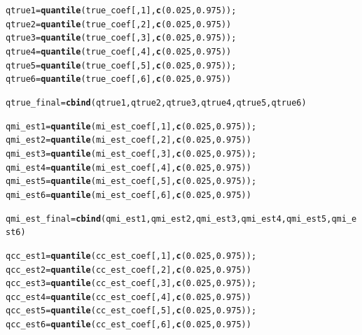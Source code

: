 \documentclass[fleqn,10pt]{wlscirep}\usepackage[]{graphicx}\usepackage[]{color}
\makeatletter
\newcommand{\hlnum}[1]{\textcolor[rgb]{0.686,0.059,0.569}{#1}}%
\newcommand{\hlstd}[1]{\textcolor[rgb]{0.345,0.345,0.345}{#1}}%
\newcommand{\hlkwb}[1]{\textcolor[rgb]{0.69,0.353,0.396}{#1}}%
\newcommand{\hlkwd}[1]{\textcolor[rgb]{0.737,0.353,0.396}{\textbf{#1}}}%
\newenvironment{kframe}{%
 \def\at@end@of@kframe{}%
 \ifinner\ifhmode%
  \def\at@end@of@kframe{\end{minipage}}%
  \begin{minipage}{\columnwidth}%
 \fi\fi%
 \def\FrameCommand##1{\hskip\@totalleftmargin \hskip-\fboxsep
 \colorbox{shadecolor}{##1}\hskip-\fboxsep
     \hskip-\linewidth \hskip-\@totalleftmargin \hskip\columnwidth}%
 \MakeFramed {\advance\hsize-\width
   \@totalleftmargin\z@ \linewidth\hsize
   \@setminipage}}%
 {\par\unskip\endMakeFramed%
 \at@end@of@kframe}
\newenvironment{knitrout}{}{} %
\makeatother
\begin{document}
\begin{knitrout}
\begin{kframe}
\begin{alltt}
  \hlstd{qtrue1} \hlkwb{=} \hlkwd{quantile}\hlstd{(true_coef[,}\hlnum{1}\hlstd{],} \hlkwd{c}\hlstd{(}\hlnum{0.025}\hlstd{,} \hlnum{0.975}\hlstd{));}
  \hlstd{qtrue2} \hlkwb{=} \hlkwd{quantile}\hlstd{(true_coef[,}\hlnum{2}\hlstd{],} \hlkwd{c}\hlstd{(}\hlnum{0.025}\hlstd{,} \hlnum{0.975}\hlstd{))}
  \hlstd{qtrue3} \hlkwb{=} \hlkwd{quantile}\hlstd{(true_coef[,}\hlnum{3}\hlstd{],} \hlkwd{c}\hlstd{(}\hlnum{0.025}\hlstd{,} \hlnum{0.975}\hlstd{));}
  \hlstd{qtrue4} \hlkwb{=} \hlkwd{quantile}\hlstd{(true_coef[,}\hlnum{4}\hlstd{],} \hlkwd{c}\hlstd{(}\hlnum{0.025}\hlstd{,} \hlnum{0.975}\hlstd{))}
  \hlstd{qtrue5} \hlkwb{=} \hlkwd{quantile}\hlstd{(true_coef[,}\hlnum{5}\hlstd{],} \hlkwd{c}\hlstd{(}\hlnum{0.025}\hlstd{,} \hlnum{0.975}\hlstd{));}
  \hlstd{qtrue6} \hlkwb{=} \hlkwd{quantile}\hlstd{(true_coef[,}\hlnum{6}\hlstd{],} \hlkwd{c}\hlstd{(}\hlnum{0.025}\hlstd{,} \hlnum{0.975}\hlstd{))}

  \hlstd{qtrue_final} \hlkwb{=} \hlkwd{cbind}\hlstd{(qtrue1, qtrue2, qtrue3, qtrue4, qtrue5, qtrue6)}

  \hlstd{qmi_est1} \hlkwb{=} \hlkwd{quantile}\hlstd{(mi_est_coef[,}\hlnum{1}\hlstd{],} \hlkwd{c}\hlstd{(}\hlnum{0.025}\hlstd{,} \hlnum{0.975}\hlstd{));}
  \hlstd{qmi_est2} \hlkwb{=} \hlkwd{quantile}\hlstd{(mi_est_coef[,}\hlnum{2}\hlstd{],} \hlkwd{c}\hlstd{(}\hlnum{0.025}\hlstd{,} \hlnum{0.975}\hlstd{))}
  \hlstd{qmi_est3} \hlkwb{=} \hlkwd{quantile}\hlstd{(mi_est_coef[,}\hlnum{3}\hlstd{],} \hlkwd{c}\hlstd{(}\hlnum{0.025}\hlstd{,} \hlnum{0.975}\hlstd{));}
  \hlstd{qmi_est4} \hlkwb{=} \hlkwd{quantile}\hlstd{(mi_est_coef[,}\hlnum{4}\hlstd{],} \hlkwd{c}\hlstd{(}\hlnum{0.025}\hlstd{,} \hlnum{0.975}\hlstd{))}
  \hlstd{qmi_est5} \hlkwb{=} \hlkwd{quantile}\hlstd{(mi_est_coef[,}\hlnum{5}\hlstd{],} \hlkwd{c}\hlstd{(}\hlnum{0.025}\hlstd{,} \hlnum{0.975}\hlstd{));}
  \hlstd{qmi_est6} \hlkwb{=} \hlkwd{quantile}\hlstd{(mi_est_coef[,}\hlnum{6}\hlstd{],} \hlkwd{c}\hlstd{(}\hlnum{0.025}\hlstd{,} \hlnum{0.975}\hlstd{))}

  \hlstd{qmi_est_final} \hlkwb{=} \hlkwd{cbind}\hlstd{(qmi_est1, qmi_est2, qmi_est3, qmi_est4, qmi_est5, qmi_est6)}

  \hlstd{qcc_est1} \hlkwb{=} \hlkwd{quantile}\hlstd{(cc_est_coef[,}\hlnum{1}\hlstd{],} \hlkwd{c}\hlstd{(}\hlnum{0.025}\hlstd{,} \hlnum{0.975}\hlstd{));}
  \hlstd{qcc_est2} \hlkwb{=} \hlkwd{quantile}\hlstd{(cc_est_coef[,}\hlnum{2}\hlstd{],} \hlkwd{c}\hlstd{(}\hlnum{0.025}\hlstd{,} \hlnum{0.975}\hlstd{))}
  \hlstd{qcc_est3} \hlkwb{=} \hlkwd{quantile}\hlstd{(cc_est_coef[,}\hlnum{3}\hlstd{],} \hlkwd{c}\hlstd{(}\hlnum{0.025}\hlstd{,} \hlnum{0.975}\hlstd{));}
  \hlstd{qcc_est4} \hlkwb{=} \hlkwd{quantile}\hlstd{(cc_est_coef[,}\hlnum{4}\hlstd{],} \hlkwd{c}\hlstd{(}\hlnum{0.025}\hlstd{,} \hlnum{0.975}\hlstd{))}
  \hlstd{qcc_est5} \hlkwb{=} \hlkwd{quantile}\hlstd{(cc_est_coef[,}\hlnum{5}\hlstd{],} \hlkwd{c}\hlstd{(}\hlnum{0.025}\hlstd{,} \hlnum{0.975}\hlstd{));}
  \hlstd{qcc_est6} \hlkwb{=} \hlkwd{quantile}\hlstd{(cc_est_coef[,}\hlnum{6}\hlstd{],} \hlkwd{c}\hlstd{(}\hlnum{0.025}\hlstd{,} \hlnum{0.975}\hlstd{))}


\end{alltt}
\end{kframe}
\end{knitrout}
\end{document}

